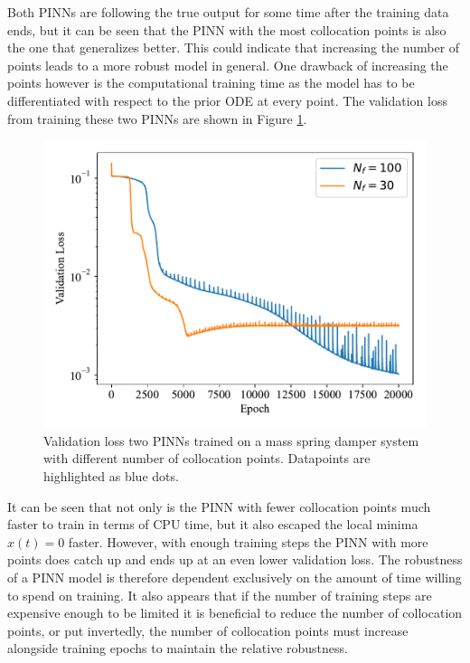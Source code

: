 Both PINNs are following the true output for some time after the training data ends, but it can be seen that the PINN with the most collocation points is also the one that generalizes better. This could indicate that increasing the number of points leads to a more robust model in general. One drawback of increasing the points however is the computational training time as the model has to be differentiated with respect to the prior ODE at every point. The validation loss from training these two PINNs are shown in Figure \ref{fig:msd_loss_pinns}.

\begin{figure}[H]
    \centering
    \includegraphics[width=1.0\linewidth]{Figures/InitialExperiments/msd_loss_pinns.pdf}
    \caption{Validation loss two PINNs trained on a mass spring damper system with different number of collocation points. Datapoints are highlighted as blue dots.}
    \label{fig:msd_loss_pinns}
\end{figure}

It can be seen that not only is the PINN with fewer collocation points much faster to train in terms of CPU time, but it also escaped the local minima $x(t) = 0$ faster. However, with enough training steps the PINN with more points does catch up and ends up at an even lower validation loss. The robustness of a PINN model is therefore dependent exclusively on the amount of time willing to spend on training. It also appears that if the number of training steps are expensive enough to be limited it is beneficial to reduce the number of collocation points, or put invertedly, the number of collocation points must increase alongside training epochs to maintain the relative robustness.

